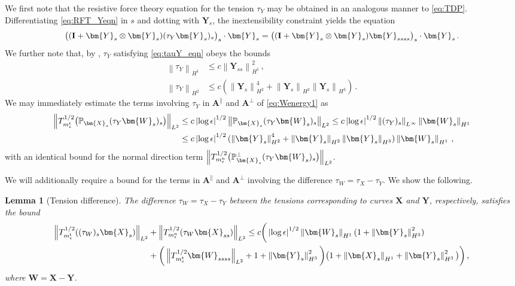 \documentclass[11pt,reqno]{amsart}
\renewcommand{\P}{\mathbb{P}}
\newcommand{\X}{\bm{X}}
\newcommand{\Y}{\bm{Y}}
\newcommand{\abs}[1]{\left\lvert #1 \right\rvert}
\newcommand{\norm}[1]{\left\lVert #1 \right\rVert}
\numberwithin{equation}{section}
\newtheorem{lemma}[theorem]{Lemma}
\theoremstyle{definition}
\begin{document}
We first note that the resistive force theory equation for the tension $\tau_Y$ may be obtained in an analogous manner to \eqref{eq:TDP}. Differentiating \eqref{eq:RFT_Yeqn} in $s$ and dotting with $\Y_s$, the inextensibility constraint yields the equation
\begin{equation}\label{eq:tauY_eqn}
  \big(({\bf I}+\Y_s\otimes\Y_s)(\tau_Y\Y_s)_s \big)_s\cdot\Y_s =\big(({\bf I}+\Y_s\otimes\Y_s)\Y_{ssss}\big)_s \cdot\Y_s\,.
\end{equation}
We further note that, by \cite[Lemma 3.3]{albritton2025rods}, $\tau_Y$ satisfying \eqref{eq:tauY_eqn} obeys the bounds
\begin{equation}\label{eq:tauYbd}
\begin{aligned}
  \norm{\tau_Y}_{H^1} &\le c\norm{\Y_{ss}}_{H^1}^2 \,, \\
  \norm{\tau_Y}_{H^2}&\le c(\norm{\Y_s}_{H^2}^4 + \norm{\Y_s}_{H^2}\norm{\Y_s}_{H^3})\,.
\end{aligned}
\end{equation}
%
%
We may immediately estimate the terms involving $\tau_Y$ in $\bm{A}^\parallel$ and $\bm{A}^\perp$ of \eqref{eq:Wenergy1} as   
\begin{equation}\label{eq:tauYterm_est}
\begin{aligned}
  \norm{T_{m_\epsilon^{\rm t}}^{1/2}\big(\P_{\X_s}(\tau_Y\bm{W}_s)_s\big)}_{L^2} &\le c\abs{\log\epsilon}^{1/2}\norm{\P_{\X_s}(\tau_Y\bm{W}_s)_s}_{L^2}
  \le c\abs{\log\epsilon}^{1/2}\norm{(\tau_Y)_s}_{L^\infty}\norm{\bm{W}_s}_{H^1}\\
  &\le c\abs{\log\epsilon}^{1/2}(\norm{\Y_s}_{H^2}^4 + \norm{\Y_s}_{H^2}\norm{\Y_s}_{H^3})\norm{\bm{W}_s}_{H^1}\,,
\end{aligned}
\end{equation}
with an identical bound for the normal direction term $\norm{T_{m_\epsilon^{\rm n}}^{1/2}\big(\P_{\X_s}^\perp(\tau_Y\bm{W}_s)_s\big)}_{L^2}$.



We will additionally require a bound for the terms in $\bm{A}^\parallel$ and $\bm{A}^\perp$ involving the difference $\tau_W=\tau_X-\tau_Y$. We show the following.
%
\begin{lemma}[Tension difference]\label{lem:tensionXY_diff}
  The difference $\tau_W=\tau_X-\tau_Y$ between the tensions corresponding to curves $\X$ and $\Y$, respectively, satisfies the bound 
\begin{equation}\label{eq:tauWbd}
\begin{aligned}
  \norm{T_{m_\epsilon^{\rm t}}^{1/2}((\tau_W)_s\X_s)}_{L^2} &+ 
  \norm{T_{m_\epsilon^{\rm n}}^{1/2}(\tau_W\X_{ss})}_{L^2}
  \le c\bigg(\abs{\log\epsilon}^{1/2}\norm{\bm{W}_s}_{H^1}(1+\norm{\Y_s}_{H^3}^2)\\
  & + \bigg(\norm{T_{m_\epsilon^{\rm t}}^{1/2}\bm{W}_{ssss}}_{L^2}+ 1+\norm{\Y_s}_{H^3}^2\bigg)\big(1+\norm{\X_s}_{H^1}+\norm{\Y_s}_{H^3}^2\big)\bigg)\,,
\end{aligned}
\end{equation}
where $\bm{W}=\X-\Y$.
\end{lemma}
\end{document}

